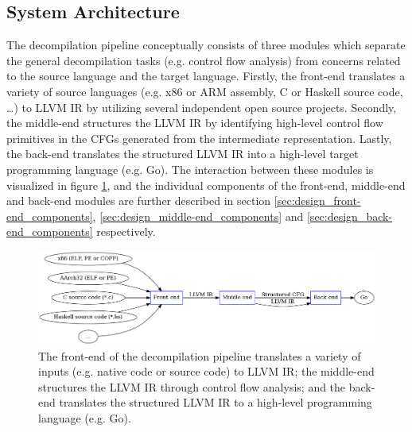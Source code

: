


\subsection{System Architecture}
\label{sec:design_system_architecture}

The decompilation pipeline conceptually consists of three modules which separate the general decompilation tasks (e.g. control flow analysis) from concerns related to the source language and the target language. Firstly, the front-end translates a variety of source languages (e.g. x86 or ARM assembly, C or Haskell source code, …) to LLVM IR by utilizing several independent open source projects. Secondly, the middle-end structures the LLVM IR by identifying high-level control flow primitives in the CFGs generated from the intermediate representation. Lastly, the back-end translates the structured LLVM IR into a high-level target programming language (e.g. Go). The interaction between these modules is visualized in figure \ref{fig:decompilation_pipeline}, and the individual components of the front-end, middle-end and back-end modules are further described in section \ref{sec:design_front-end_components}, \ref{sec:design_middle-end_components} and \ref{sec:design_back-end_components} respectively.

\begin{figure}[htbp]
	\begin{center}
		\includegraphics[width=\textwidth]{inc/6_design/decompilation_pipeline.png}
		\caption{The front-end of the decompilation pipeline translates a variety of inputs (e.g. native code or source code) to LLVM IR; the middle-end structures the LLVM IR through control flow analysis; and the back-end translates the structured LLVM IR to a high-level programming language (e.g. Go).}
		\label{fig:decompilation_pipeline}
	\end{center}
\end{figure}

